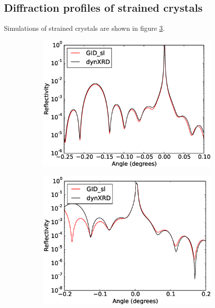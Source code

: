 \documentclass[12pt,oneside,notitlepage,abstracton,a4paper]{scrartcl}
\begin{document}
\subsection{Diffraction profiles of strained crystals}\label{res2}

Simulations of strained crystals are shown in figure \ref{testsstrain}.
\begin{figure}
 \centering
 \begin{subfigure}[h]{0.49\textwidth}
  \includegraphics[width=\textwidth]{pics/test12.eps}
  \caption{}\label{test12}
  \label{test12}
 \end{subfigure}
 \begin{subfigure}[h]{0.49\textwidth}
  \includegraphics[width=\textwidth]{pics/test14.eps}
  \caption{}\label{test14}
  \label{test14}
 \end{subfigure}
 \caption{}\label{testsstrain}
\end{figure}
\end{document}
